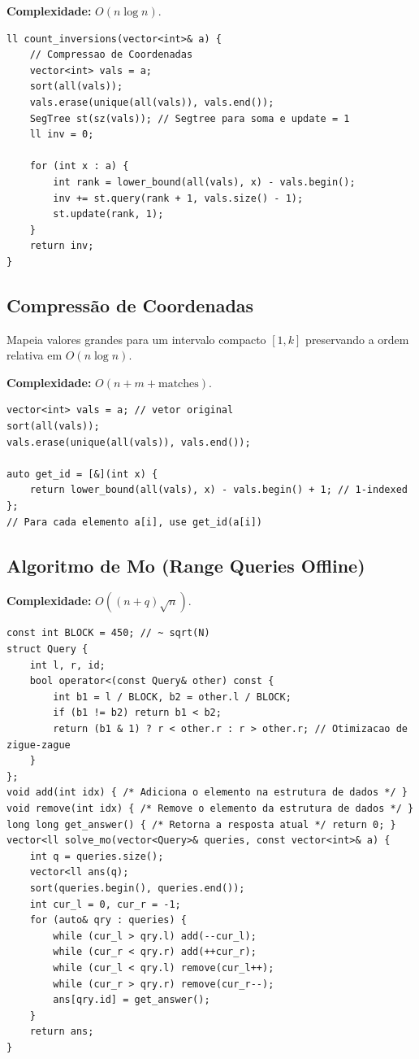 \textbf{Complexidade:} $O(n\log n)$.

\begin{lstlisting}
ll count_inversions(vector<int>& a) {
    // Compressao de Coordenadas
    vector<int> vals = a;
    sort(all(vals));
    vals.erase(unique(all(vals)), vals.end());
    SegTree st(sz(vals)); // Segtree para soma e update = 1
    ll inv = 0;

    for (int x : a) {
        int rank = lower_bound(all(vals), x) - vals.begin();
        inv += st.query(rank + 1, vals.size() - 1); 
        st.update(rank, 1);
    }
    return inv;
}
\end{lstlisting}


\subsection{Compressão de Coordenadas}

Mapeia valores grandes para um intervalo compacto $[1, k]$ preservando a ordem relativa em $O(n \log n)$.

\textbf{Complexidade:} $O(n + m + \text{matches})$.

\begin{lstlisting}
vector<int> vals = a; // vetor original
sort(all(vals));
vals.erase(unique(all(vals)), vals.end());

auto get_id = [&](int x) {
    return lower_bound(all(vals), x) - vals.begin() + 1; // 1-indexed
};
// Para cada elemento a[i], use get_id(a[i])
\end{lstlisting}


\subsection{Algoritmo de Mo (Range Queries Offline)}

\textbf{Complexidade:} $O((n + q) \sqrt{n})$.

\begin{lstlisting}
const int BLOCK = 450; // ~ sqrt(N)
struct Query {
    int l, r, id;
    bool operator<(const Query& other) const {
        int b1 = l / BLOCK, b2 = other.l / BLOCK;
        if (b1 != b2) return b1 < b2;
        return (b1 & 1) ? r < other.r : r > other.r; // Otimizacao de zigue-zague
    }
};
void add(int idx) { /* Adiciona o elemento na estrutura de dados */ }
void remove(int idx) { /* Remove o elemento da estrutura de dados */ }
long long get_answer() { /* Retorna a resposta atual */ return 0; }
vector<ll solve_mo(vector<Query>& queries, const vector<int>& a) {
    int q = queries.size();
    vector<ll ans(q);
    sort(queries.begin(), queries.end());
    int cur_l = 0, cur_r = -1;
    for (auto& qry : queries) {
        while (cur_l > qry.l) add(--cur_l);
        while (cur_r < qry.r) add(++cur_r);
        while (cur_l < qry.l) remove(cur_l++);
        while (cur_r > qry.r) remove(cur_r--);
        ans[qry.id] = get_answer();
    }
    return ans;
}
\end{lstlisting}


